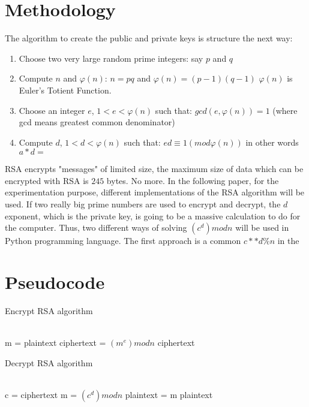 \documentclass[conference]{IEEEtran}
\begin{document}
\section{Methodology}
The algorithm to create the public and private keys is structure the next way:
\begin{enumerate}
    \item Choose two very large random prime integers: say $p$ and $q$
    \item Compute $n$ and $φ(n)$: $n = pq$ and $φ(n) = (p-1)(q-1)$ $φ(n)$ is Euler’s Totient Function. 
    \item Choose an integer $e$, $1 < e < φ(n)$ such that:
        $gcd(e, φ(n)) = 1$ (where gcd means greatest common denominator)
    \item Compute $d$, $1 < d < φ(n)$ such that:
        $ed ≡ 1 (mod φ(n))$ in other words $a*d = $
\end{enumerate}
RSA encrypts "messages" of limited size, the maximum size of data which can be encrypted with RSA is $245$ bytes. No more. \newline
In the following paper, for the experimentation purpose, different implementations of the RSA algorithm will be used.
If two really big prime numbers are used to encrypt and decrypt, the $d$ exponent, which is the private key, is going to be a massive calculation to do for the computer. Thus, two different ways of solving $(c^d)modn$ will be used in Python programming language. The first approach is a common $c**d$\%$n$ in the 

\section{Pseudocode}
  \begin{algorithm}
   \caption{Encrypt RSA algorithm}
    \begin{algorithmic}[1]
      \\
        \State m = plaintext
        \State ciphertext = $(m^e)modn$
        \State \Return ciphertext
       \EndFunction
\end{algorithmic}
\end{algorithm}
\begin{algorithm}
   \caption{Decrypt RSA algorithm}
    \begin{algorithmic}[1]
      \\
        \State c = ciphertext
        \State m = $(c^d)modn$
        \State plaintext = m
        \State \Return plaintext
       \EndFunction
\end{algorithmic}
\end{algorithm}
\end{document}

